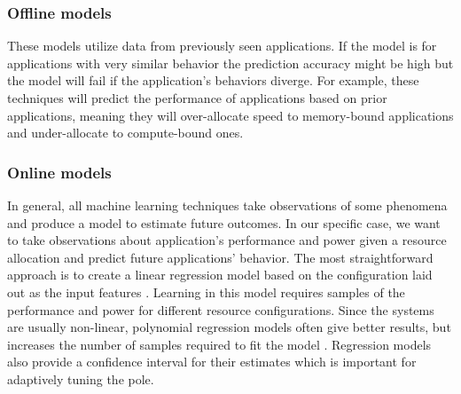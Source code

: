 \subsubsection{Offline models}
These models utilize data from previously seen applications. If the
model is for applications with very similar behavior the prediction
accuracy might be high but the model will fail if the application's
behaviors diverge.  For example, these
techniques will predict the performance of applications based on prior
applications, meaning they will over-allocate speed to memory-bound
applications and under-allocate to compute-bound ones.

\subsubsection{Online models}
In general, all machine learning techniques take observations of some
phenomena and produce a model to estimate future outcomes.  In our
specific case, we want to take observations about application's
performance and power given a resource allocation and predict future
applications' behavior.  The most straightforward approach is to
create a linear regression model based on the configuration laid out
as the input features
\cite{tibshirani1996regression,yuan2006model,CPR}.  Learning in this
model requires samples of the performance and power for different
resource configurations.  Since the systems are usually non-linear,
polynomial regression models often give better results, but increases
the number of samples required to fit the model \cite{LeeBrooks}.
Regression models also provide a confidence interval for their
estimates which is important for adaptively tuning the pole.


